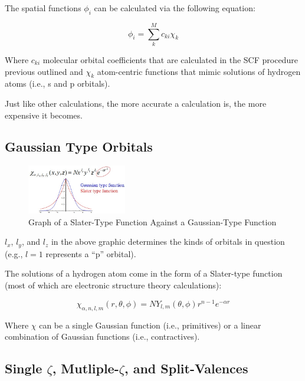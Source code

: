 \documentclass[
  letterpaper,
  DIV=11,
  numbers=noendperiod]{scrreprt}
\begin{document}
The spatial functions \(\phi_i\) can be calculated via the following
equation:

\begin{equation}
  \phi_i = \sum_k^Mc_{ki}\chi_k
\end{equation}

Where \(c_{ki}\) molecular orbital coefficients that are calculated in
the SCF procedure previous outlined and \(\chi_k\) atom-centric
functions that mimic solutions of hydrogen atoms (i.e., s and p
orbitals).

Just like other calculations, the more accurate a calculation is, the
more expensive it becomes.

\hypertarget{gaussian-type-orbitals}{%
\subsection{Gaussian Type Orbitals}\label{gaussian-type-orbitals}}

\begin{figure}

{\centering \includegraphics[width=1.71in,height=\textheight]{./images/wk2a/gaussian.jpg}

}

\caption{Graph of a Slater-Type Function Against a Gaussian-Type
Function}

\end{figure}

\(l_x\), \(l_y\), and \(l_z\) in the above graphic determines the kinds
of orbitals in question (e.g., \(l = 1\) represents a ``p'' orbital).

The solutions of a hydrogen atom come in the form of a Slater-type
function (most of which are electronic structure theory calculations):

\begin{equation}
  \chi_{\alpha, n, l, m}(r, \theta, \phi) = NY_{l, m}(\theta, \phi)r^{n - 1}e^{-\alpha r}
\end{equation}

Where \(\chi\) can be a single Gaussian function (i.e., primitives) or a
linear combination of Gaussian functions (i.e., contractives).

\hypertarget{single-zeta-mutliple-zeta-and-split-valences}{%
\subsection{\texorpdfstring{Single \(\zeta\), Mutliple-\(\zeta\), and
Split-Valences}{Single \textbackslash zeta, Mutliple-\textbackslash zeta, and Split-Valences}}\label{single-zeta-mutliple-zeta-and-split-valences}}
\end{document}
